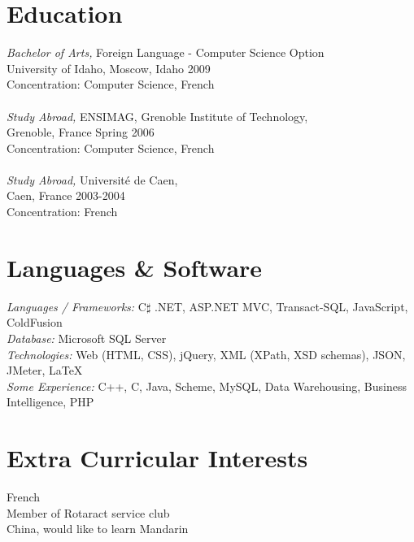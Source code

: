 \documentclass[line,margin]{res}
\begin{document}
\begin{resume}
 
\section{Education} {\sl Bachelor of Arts,} Foreign Language - Computer Science Option\\
                University of Idaho, Moscow, Idaho
                2009 \\
                Concentration: Computer Science, French\\
		\\
		{\sl Study Abroad,} 
		ENSIMAG, Grenoble Institute of Technology, \\ Grenoble, France 
		Spring 2006 \\
		Concentration: Computer Science, French \\
		\\
		{\sl Study Abroad,} 
		Universit\'{e} de Caen, \\ Caen, France 
		2003-2004 \\
		Concentration: French
		
 
 
\section{Languages \& Software} {\sl Languages / Frameworks:} C\ensuremath{\sharp}  .NET, ASP.NET MVC, Transact-SQL, JavaScript, ColdFusion \\
				{\sl Database:} Microsoft SQL Server \\
				{\sl Technologies:} Web (HTML, CSS), jQuery, XML (XPath, XSD schemas), JSON, JMeter, \LaTeX \\
				{\sl Some Experience:} C++, C, Java, Scheme, MySQL, Data Warehousing, Business Intelligence, PHP \\ 

\section{Extra Curricular Interests}             
	    French \\
	    Member of Rotaract service club \\
	    China, would like to learn Mandarin \\ 

\end{resume}
\end{document}
